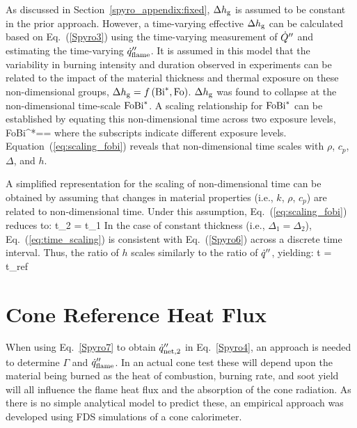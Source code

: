 As discussed in Section~\ref{spyro_appendix:fixed}, $\Delta h_{\rm g}$ is assumed to be constant in the prior approach. However, a time-varying effective $\Delta h_{\rm g}$ can be calculated based on Eq.~(\ref{Spyro3}) using the time-varying measurement of $\dot{Q}''$ and estimating the time-varying $\dot{q}''_{\rm flame}$. It is assumed in this model that the variability in burning intensity and duration observed in experiments can be related to the impact of the material thickness and thermal exposure on these non-dimensional groups, $\Delta h_{\rm g}=f\left(\hbox{Bi}^{*},\hbox{Fo}\right)$.  $\Delta h_{\rm g}$ was found to collapse at the non-dimensional time-scale $\hbox{FoBi}^{*}$. A scaling relationship for $\hbox{FoBi}^{*}$ can be established by equating this non-dimensional time across two exposure levels,
\be
\hbox{FoBi}^{*}==
\label{eq:scaling_fobi}
\ee
where the subscripts indicate different exposure levels. Equation~(\ref{eq:scaling_fobi}) reveals that non-dimensional time scales with $\rho$, $c_p$, $\Delta$, and $h$.

A simplified representation for the scaling of non-dimensional time can be obtained by assuming that changes in material properties (i.e., $k$, $\rho$, $c_p$) are related to non-dimensional time. Under this assumption, Eq.~(\ref{eq:scaling_fobi}) reduces to:
\be
t_{2} =  t_1
\label{eq:time_scaling}
\ee
In the case of constant thickness (i.e., $\Delta_{1}=\Delta_{2}$), Eq.~(\ref{eq:time_scaling}) is consistent with Eq.~(\ref{Spyro6}) across a discrete time interval. Thus, the ratio of $h$ scales similarly to the ratio of $\dot{q}''$, yielding:
\be
\Delta t = \Delta t_{\rm ref}
\label{eq:time_scaling2}
\ee


\section{Cone Reference Heat Flux}
\label{Spyro_q_flame}

When using Eq.~\ref{Spyro7} to obtain $\dot{q}_{{\rm net},2}''$ in Eq.~\ref{Spyro4}, an approach is needed to determine $\Gamma$ and $\dot{q}_{\rm flame}''$. In an actual cone test these will depend upon the material being burned as the heat of combustion, burning rate, and soot yield will all influence the flame heat flux and the absorption of the cone radiation. As there is no simple analytical model to predict these, an empirical approach was developed using FDS simulations of a cone calorimeter.

